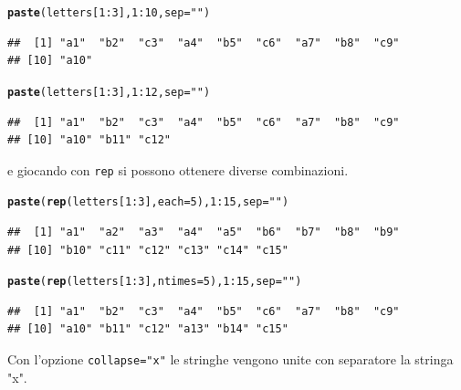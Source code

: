 \documentclass[onecolumn,12pt]{book}\usepackage[]{graphicx}\usepackage[]{color}
\makeatletter
\newcommand{\hlnum}[1]{\textcolor[rgb]{0.686,0.059,0.569}{#1}}%
\newcommand{\hlstr}[1]{\textcolor[rgb]{0.192,0.494,0.8}{#1}}%
\newcommand{\hlopt}[1]{\textcolor[rgb]{0,0,0}{#1}}%
\newcommand{\hlstd}[1]{\textcolor[rgb]{0.345,0.345,0.345}{#1}}%
\newcommand{\hlkwc}[1]{\textcolor[rgb]{0.333,0.667,0.333}{#1}}%
\newcommand{\hlkwd}[1]{\textcolor[rgb]{0.737,0.353,0.396}{\textbf{#1}}}%
\newenvironment{kframe}{%
 \def\at@end@of@kframe{}%
 \ifinner\ifhmode%
  \def\at@end@of@kframe{\end{minipage}}%
  \begin{minipage}{\columnwidth}%
 \fi\fi%
 \def\FrameCommand##1{\hskip\@totalleftmargin \hskip-\fboxsep
 \colorbox{shadecolor}{##1}\hskip-\fboxsep
     \hskip-\linewidth \hskip-\@totalleftmargin \hskip\columnwidth}%
 \MakeFramed {\advance\hsize-\width
   \@totalleftmargin\z@ \linewidth\hsize
   \@setminipage}}%
 {\par\unskip\endMakeFramed%
 \at@end@of@kframe}
\newenvironment{knitrout}{}{} %
\makeatother
\begin{document}
\begin{knitrout}
\color{fgcolor}\begin{kframe}
\begin{alltt}
\hlkwd{paste}\hlstd{(letters[}\hlnum{1}\hlopt{:}\hlnum{3}\hlstd{],}\hlnum{1}\hlopt{:}\hlnum{10}\hlstd{,}\hlkwc{sep}\hlstd{=}\hlstr{""}\hlstd{)}
\end{alltt}
\begin{verbatim}
##  [1] "a1"  "b2"  "c3"  "a4"  "b5"  "c6"  "a7"  "b8"  "c9" 
## [10] "a10"
\end{verbatim}
\begin{alltt}
\hlkwd{paste}\hlstd{(letters[}\hlnum{1}\hlopt{:}\hlnum{3}\hlstd{],}\hlnum{1}\hlopt{:}\hlnum{12}\hlstd{,}\hlkwc{sep}\hlstd{=}\hlstr{""}\hlstd{)}
\end{alltt}
\begin{verbatim}
##  [1] "a1"  "b2"  "c3"  "a4"  "b5"  "c6"  "a7"  "b8"  "c9" 
## [10] "a10" "b11" "c12"
\end{verbatim}
\end{kframe}
\end{knitrout}
e giocando con \texttt{rep} si possono ottenere diverse combinazioni.
\begin{knitrout}
\color{fgcolor}\begin{kframe}
\begin{alltt}
\hlkwd{paste}\hlstd{(}\hlkwd{rep}\hlstd{(letters[}\hlnum{1}\hlopt{:}\hlnum{3}\hlstd{],}\hlkwc{each}\hlstd{=}\hlnum{5}\hlstd{),}\hlnum{1}\hlopt{:}\hlnum{15}\hlstd{,}\hlkwc{sep}\hlstd{=}\hlstr{""}\hlstd{)}
\end{alltt}
\begin{verbatim}
##  [1] "a1"  "a2"  "a3"  "a4"  "a5"  "b6"  "b7"  "b8"  "b9" 
## [10] "b10" "c11" "c12" "c13" "c14" "c15"
\end{verbatim}
\begin{alltt}
\hlkwd{paste}\hlstd{(}\hlkwd{rep}\hlstd{(letters[}\hlnum{1}\hlopt{:}\hlnum{3}\hlstd{],}\hlkwc{ntimes}\hlstd{=}\hlnum{5}\hlstd{),}\hlnum{1}\hlopt{:}\hlnum{15}\hlstd{,}\hlkwc{sep}\hlstd{=}\hlstr{""}\hlstd{)}
\end{alltt}
\begin{verbatim}
##  [1] "a1"  "b2"  "c3"  "a4"  "b5"  "c6"  "a7"  "b8"  "c9" 
## [10] "a10" "b11" "c12" "a13" "b14" "c15"
\end{verbatim}
\end{kframe}
\end{knitrout}
Con l'opzione \texttt{collapse="x"} le stringhe vengono unite con separatore la stringa "x".
\end{document}
